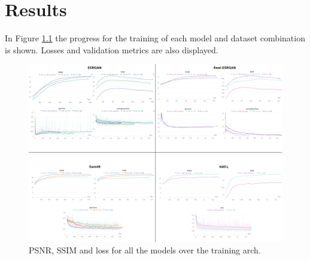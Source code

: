 \newpage
\chapter{Results}
\label{cha:Results}

In Figure \ref{img:all_training} the progress for the training of each model and dataset combination is shown. Losses
and validation metrics are also displayed.





\begin{figure}[H]
  \centering
  \includegraphics[scale=0.15,angle=90,origin=c]{figures/ALL_compose2.png}
  \caption{PSNR, SSIM and loss for all the models over the training arch.}
  \label{img:all_training}
\end{figure}


